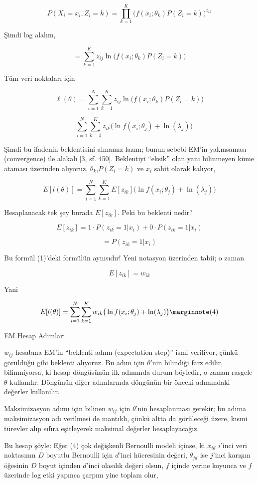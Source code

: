 \documentclass[12pt,fleqn]{article}\usepackage{../../common}
\begin{document}
$$  P(X_i = x_i, Z_i=k) =  
\prod _{k=1}^{K} \big( f(x_i;\theta_k)P(Z_i=k) \big)^{z_{ik}} $$

Şimdi log alalım, 

$$  = \sum _{k=1}^{K} z_{ij} \ln \big( f(x_i;\theta_k)P(Z_i=k) \big) $$

Tüm veri noktaları için

$$  \ell(\theta) = 
\sum _{i=1}^{N} \sum _{k=1}^{K} z_{ij} \ln \big( f(x_i;\theta_k)P(Z_i=k) \big) $$

$$ 
= \sum _{i=1}^{N} \sum _{k=1}^{K} z_{ik} 
\big( \ln f(x_i;\theta_j) + \ln(\lambda_j) \big)   
$$

Şimdi bu ifadenin beklentisini almamız lazım; bunun sebebi EM'in yakınsaması
(convergence) ile alakalı [3, sf. 450]. Beklentiyi ``eksik'' olan yani
bilinmeyen küme ataması üzerinden alıyoruz, $\theta_k$,$P(Z_i=k)$ ve $x_i$ sabit
olarak kalıyor,

$$ 
E[l(\theta)] = \sum _{i=1}^{N} \sum _{k=1}^{K} E[z_{ik}]
\big( \ln f(x_i;\theta_j) + \ln(\lambda_j) \big)   
$$

Hesaplanacak tek şey burada $E[z_{ik}]$. Peki bu beklenti nedir? 

$$ E[z_{ik}] = 1 \cdot P(z_{ik}=1 | x_i) + 0 \cdot P(z_{ik}=1 | x_i)  $$

$$=  P(z_{ik}=1 | x_i)  $$

Bu formül (1)'deki formülün aynısıdır! Yeni notasyon üzerinden tabii; o
zaman 

$$  E[z_{ik}] = w_{ik} $$

Yani

$$ 
E[l(\theta)] = \sum _{i=1}^{N} \sum _{k=1}^{K} w_{ik}
\big( \ln f(x_i;\theta_j) + \ln(\lambda_j) \big) 
\mlabel{4}
$$

EM Hesap Adımları

$w_{ij}$ hesabına EM'in ``beklenti adımı (expectation step)'' ismi veriliyor,
çünkü görüldüğü gibi beklenti alıyoruz. Bu adım için $\theta$'nin bilindiği farz
edilir, bilinmiyorsa, ki hesap döngüsünün ilk adımında durum böyledir, o zaman
rasgele $\theta$ kullanılır. Döngünün diğer adımlarında döngünün bir önceki
adımındaki değerler kullanılır.

Maksimizasyon adımı için bilinen $w_{ij}$ için $\theta$'nin hesaplanması
gerekir; bu adıma maksimizasyon adı verilmesi de mantıklı, çünkü altta da
görüleceği üzere, kısmi türevler alıp sıfıra eşitleyerek maksimal değerler
hesaplayacağız.

Bu hesap şöyle: Eğer (4) çok değişkenli Bernoulli modeli içinse, ki $x_{id}$
$i$'inci veri noktasının $D$ boyutlu Bernoulli için $d$'inci hücresinin değeri,
$\theta_{jd}$ ise $j$'inci karışım öğesinin $D$ boyut içinden $d$'inci olasılık
değeri olsun, $f$ içinde yerine koyunca ve $f$ üzerinde log etki yapınca çarpım
yine toplam olur,
\end{document}
